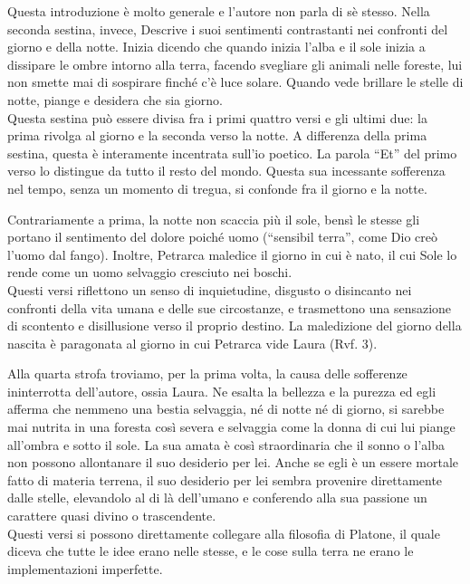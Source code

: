 \documentclass[a4paper]{article}
\newcommand*\circled[1]{\tikz[baseline=(char.base)]{
            \node[shape=circle,draw,inner sep=2pt] (char) {#1};}}
\newcommand{\quotes}[1]{``#1''}
\begin{document}
\circled{2} Questa introduzione è molto generale e l'autore non parla di sè stesso.
Nella seconda sestina, invece, Descrive i suoi sentimenti contrastanti nei confronti
del giorno e della notte.
Inizia dicendo che quando inizia l'alba e il sole inizia a dissipare
le ombre intorno alla terra, facendo svegliare gli animali nelle foreste,
lui non smette mai di sospirare finché c'è luce solare.
Quando vede brillare le stelle di notte, piange e desidera che sia giorno. \\
Questa sestina può essere divisa fra i primi quattro versi e gli ultimi due:
la prima rivolga al giorno e la seconda verso la notte.
A differenza della prima sestina, questa è interamente incentrata sull'io poetico.
La parola \quotes{Et} del primo verso lo distingue da tutto il resto del mondo.
Questa sua incessante sofferenza nel tempo, senza un momento di tregua,
si confonde fra il giorno e la notte.

\circled{3} Contrariamente a prima, la notte non scaccia più il sole, bensì
le stesse gli portano il sentimento del dolore poiché uomo (\quotes{sensibil terra},
come Dio creò l'uomo dal fango).
Inoltre, Petrarca maledice il giorno in cui è nato, il cui Sole lo rende come un uomo selvaggio cresciuto nei boschi.
\\
Questi versi riflettono un senso di inquietudine,
disgusto o disincanto nei confronti della vita umana e delle sue circostanze,
e trasmettono una sensazione di scontento e disillusione verso il proprio destino.
La maledizione del giorno della nascita è paragonata al giorno in cui Petrarca vide Laura (Rvf. 3).

\circled{4} Alla quarta strofa troviamo, per la prima volta, la causa delle sofferenze ininterrotta dell'autore,
ossia Laura. Ne esalta la bellezza e la purezza ed egli afferma che nemmeno una bestia selvaggia,
né di notte né di giorno, si sarebbe mai nutrita in una foresta così severa
e selvaggia come la donna di cui lui piange all'ombra e sotto il sole.
La sua amata è così straordinaria che il sonno o
l'alba non possono allontanare il suo desiderio per lei.
Anche se egli è un essere mortale fatto di materia terrena,
il suo desiderio per lei sembra provenire direttamente dalle stelle,
elevandolo al di là dell'umano e conferendo alla sua passione un carattere
quasi divino o trascendente. \\
Questi versi si possono direttamente collegare alla filosofia di Platone, il quale
diceva che tutte le idee erano nelle stesse, e le cose sulla terra ne erano le implementazioni
imperfette.
\end{document}
